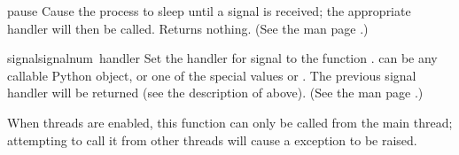 \begin{funcdesc}{pause}{}
  Cause the process to sleep until a signal is received; the
  appropriate handler will then be called.  Returns nothing.  (See the
  \UNIX{} man page .)
\end{funcdesc}

\begin{funcdesc}{signal}{signalnum\, handler}
  Set the handler for signal  to the function
  .   can be any callable Python object, or
  one of the special values  or
  .  The previous signal handler will be returned
  (see the description of  above).  (See the \UNIX{}
  man page .)

  When threads are enabled, this function can only be called from the
  main thread; attempting to call it from other threads will cause a
   exception to be raised.
\end{funcdesc}
